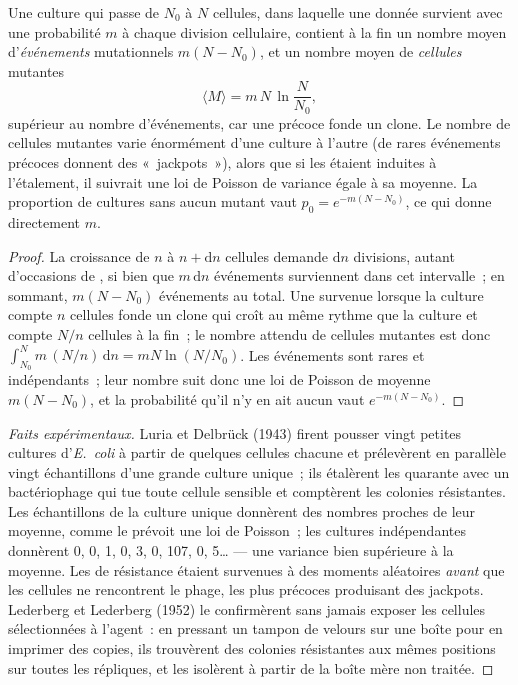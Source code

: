 \begin{theorem}\label{thm:b2:genome-diversification:luria}
Une culture qui passe de $N_0$ à $N$ cellules, dans laquelle une 
donnée survient avec une probabilité $m$ à chaque division cellulaire,
contient à la fin un nombre moyen d'\emph{événements} mutationnels
$m(N - N_0)$, et un nombre moyen de \emph{cellules} mutantes
\[
\langle M\rangle = m\,N\,\ln\frac{N}{N_0},
\]
supérieur au nombre d'événements, car une  précoce fonde un
clone. Le nombre de cellules mutantes varie énormément d'une culture à
l'autre (de rares événements précoces donnent des «~jackpots~»), alors
que si les  étaient induites à l'étalement, il suivrait une loi
de Poisson de variance égale à sa moyenne. La proportion de cultures
sans aucun mutant vaut $p_0 = e^{-m(N - N_0)}$, ce qui donne
directement $m$.
\end{theorem}
\begin{proof}
La croissance de $n$ à $n + \mathrm{d}n$ cellules demande $\mathrm{d}n$
divisions, autant d'occasions de , si bien que $m\,\mathrm{d}n$
événements surviennent dans cet intervalle~; en sommant, $m(N - N_0)$
événements au total. Une  survenue lorsque la culture compte $n$
cellules fonde un clone qui croît au même rythme que la culture et
compte $N/n$ cellules à la fin~; le nombre attendu de cellules mutantes
est donc
$\int_{N_0}^{N} m\,(N/n)\,\mathrm{d}n = mN\ln(N/N_0)$. Les événements
sont rares et indépendants~; leur nombre suit donc une loi de Poisson
de moyenne
$m(N - N_0)$, et la probabilité qu'il n'y en ait aucun vaut $e^{-m(N - N_0)}$.
\end{proof}
\begin{proof}[Faits expérimentaux]
Luria et Delbrück (1943) firent pousser vingt petites cultures
d'\emph{E.~coli} à partir de quelques cellules chacune et prélevèrent en
parallèle vingt échantillons d'une grande culture unique~; ils étalèrent
les quarante avec un bactériophage qui tue toute cellule sensible et
comptèrent les colonies résistantes. Les échantillons de la culture
unique donnèrent des nombres proches de leur moyenne, comme le prévoit
une loi de Poisson~; les cultures indépendantes donnèrent 0, 0, 1, 0, 3,
0, 107, 0, 5\dots{} --- une variance bien supérieure à la moyenne. Les
 de résistance étaient survenues à des moments aléatoires
\emph{avant} que les cellules ne rencontrent le phage, les plus précoces
produisant des jackpots. Lederberg et Lederberg (1952) le confirmèrent
sans jamais exposer les cellules sélectionnées à l'agent~: en pressant un
tampon de velours sur une boîte pour en imprimer des copies, ils
trouvèrent des colonies résistantes aux mêmes positions sur toutes les
répliques, et les isolèrent à partir de la boîte mère non traitée.
\end{proof}

